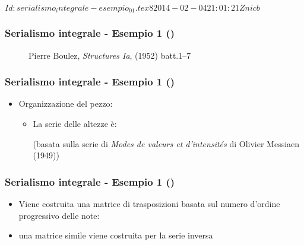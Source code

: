 %
%
\svnInfo $Id: serialismo_integrale-esempio_01.tex 8 2014-02-04 21:01:21Z nicb $

\setcounter{ms}{0}
\begin{frame}
    \frametitle{Serialismo integrale - Esempio 1 ()}

    \begin{center}
        \begin{figure}
            \caption{Pierre Boulez, \emph{Structures Ia}, (1952) batt.1--7}
        \end{figure}
    \end{center}

\end{frame}

\begin{frame}
    \frametitle{Serialismo integrale - Esempio 1 ()}

    \begin{itemize}

        \item Organizzazione del pezzo:

        \begin{itemize}

            \item La serie delle altezze \`e:

                \vspace{\baselineskip}

                \vspace{\baselineskip}
                (basata sulla serie di
                \emph{Modes de valeurs et d'intensit\'es}
                di Olivier Messiaen (1949))

        \end{itemize}

    \end{itemize}

\end{frame}

\begin{frame}
    \frametitle{Serialismo integrale - Esempio 1 ()}

    \begin{itemize}

            \item Viene costruita una matrice di trasposizioni basata
                  sul numero d'ordine progressivo delle note:


            \item una matrice simile viene costruita per la serie inversa

    \end{itemize}

\end{frame}

